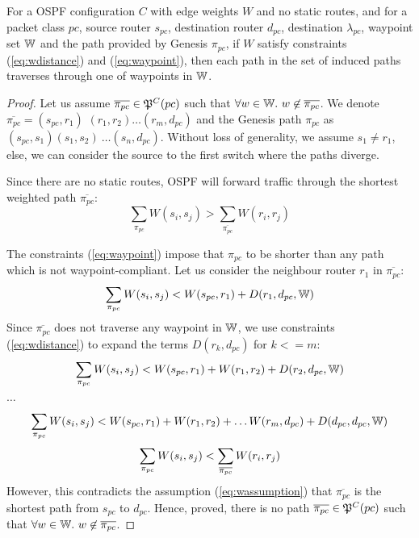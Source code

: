 \begin{theorem}
	For a OSPF configuration $C$ with edge weights $W$ and no 
	static routes, and for a packet class $pc$, source router $s_{pc}$, destination router $d_{pc}$, destination $\lambda_{pc}$, waypoint set $\mathbb{W}$ and the path provided by Genesis $\pi_{pc}$, if $W$ satisfy constraints (\ref{eq:wdistance}) and (\ref{eq:waypoint}), then each path in 
	the set of induced paths traverses through one of waypoints in $\mathbb{W}$.
\end{theorem}
\begin{proof}
	Let us assume $\overline{\pi_{pc}} \in \mathfrak{P}^C(pc)$ such that $\forall w \in \mathbb{W}.~
	w \not\in \overline{\pi_{pc}}$. We denote $\overline{\pi_{pc}} =  (s_{pc}, r_1)$ $(r_1, r_2)\ldots (r_m, d_{pc})$ and the Genesis path $\pi_{pc}$ as $(s_{pc}, s_1)(s_1, s_2) \
	\ldots (s_n, d_{pc})$. Without loss of generality, we assume $s_1 \not= r_1$, 
	else, we can consider the source to the first switch where the paths diverge. 
	
	\noindent Since there are no static routes, OSPF will forward 
	traffic through the shortest weighted path $\overline{\pi_{pc}}$:
	\begin{equation} \label{eq:wassumption}
	\sum_{\pi_{pc}} W(s_i, s_j) > \sum_{\overline{\pi_{pc}}} W(r_i, r_j)
	\end{equation}
	
The constraints (\ref{eq:waypoint}) impose that $\pi_{pc}$ to be 
shorter than any path which is not waypoint-compliant. 
Let us consider the neighbour router $r_1$ in $\overline{\pi_{pc}}$:
\[
	\sum_{\mathclap{\substack{\pi_{pc}}}} 
	W(s_i,s_j) < W(s_{pc}, r_1)+ D(r_1, d_{pc}, \waypt)
\]
Since $\overline{\pi_{pc}}$ does not traverse any waypoint in $\mathbb{W}$,
we use constraints (\ref{eq:wdistance}) 
to expand the terms $D(r_k, d_{pc})$ for $k <= m$:
\[
\sum_{\mathclap{\substack{\pi_{pc}}}} 
W(s_i,s_j) < W(s_{pc}, r_1)+ W(r_1, r_2) + D(r_2, d_{pc}, \waypt)
\] 
\begin{center}
$\ldots$
\end{center}
\[
\sum_{\mathclap{\substack{\pi_{pc}}}} 
W(s_i,s_j) < W(s_{pc}, r_1)+ W(r_1, r_2) + \ldots W(r_{m}, d_{pc}) + D(d_{pc}, d_{pc}, \waypt)
\] 
\[
\sum_{\mathclap{\substack{\pi_{pc}}}} 
W(s_i,s_j) < 
\sum_{\mathclap{\substack{\overline{\pi_{pc}}}}} 
W(r_i,r_j)
\]
However, this contradicts the assumption (\ref{eq:wassumption}) that 
$\overline{\pi_{pc}}$ is the shortest path from $s_{pc}$ to $d_{pc}$. Hence, proved, there is no path $\overline{\pi_{pc}} \in \mathfrak{P}^C(pc)$ such that $\forall w \in \mathbb{W}.~
w \not\in \overline{\pi_{pc}}$. 
\end{proof}

